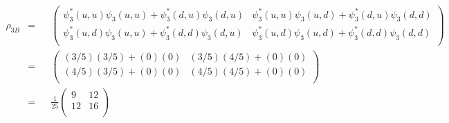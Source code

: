 \documentclass[solutions.tex]{subfiles}
\begin{document}
\begin{equation*}\begin{aligned}
	\rho_{3B} &=&& \begin{pmatrix}
		\psi_3^*(u,u)\psi_3(u,u) + \psi_3^*(d,u)\psi_3(d,u) &
			\psi_3^*(u,u)\psi_3(u,d) + \psi_3^*(d,u)\psi_3(d,d) \\
		\psi_3^*(u,d)\psi_3(u,u) + \psi_3^*(d,d)\psi_3(d,u)&
			\psi_3^*(u,d)\psi_3(u,d) + \psi_3^*(d,d)\psi_3(d,d) \\
	\end{pmatrix} \\
	~ &=&& \begin{pmatrix}
		(3/5)(3/5) + (0)(0) & (3/5)(4/5) + (0)(0) \\
		(4/5)(3/5) + (0)(0) & (4/5)(4/5) + (0)(0) \\
	\end{pmatrix} \\
	&=&& \boxed{\frac{1}{25}\begin{pmatrix}
		9 & 12 \\
		12 & 16 \\
	\end{pmatrix}}
\end{aligned}\end{equation*}
\end{document}
